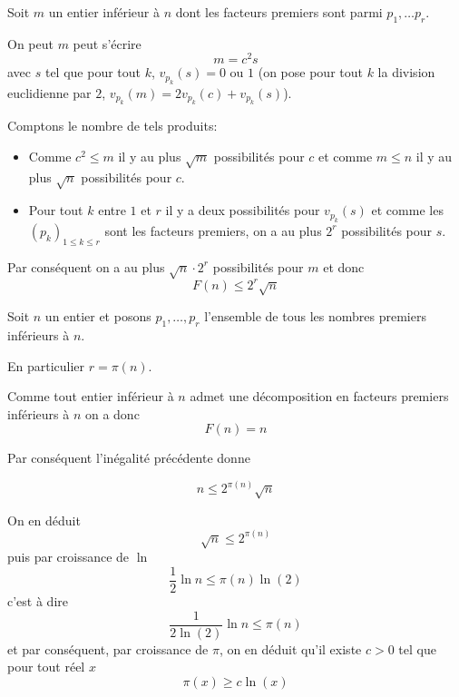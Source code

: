 \begin{sol}
Soit $m$ un entier inférieur à $n$ dont les facteurs premiers sont parmi $p_1, \ldots p_r$.

On peut $m$ peut s'écrire
$$ m = c^2 s$$
avec $s$ tel que pour tout $k$, $v_{p_k}(s) = 0 \text{ ou } 1$ (on pose pour tout $k$ la division euclidienne par $2$, $v_{p_k}(m) = 2 v_{p_k}(c) + v_{p_k}(s)$).

Comptons le nombre de tels produits:
\begin{itemize}
    \item Comme $c^2 \le m$ il y au plus $\sqrt m$ possibilités pour $c$ et comme $m \le n$ il y au plus $\sqrt n$ possibilités pour $c$.
    \item Pour tout $k$ entre $1$ et $r$ il y a deux possibilités pour $v_{p_k}(s)$ et comme les $(p_k)_{1 \le k \le r}$ sont les facteurs premiers, on a au plus $2^r$ possibilités pour $s$.
\end{itemize}

Par conséquent on a au plus $\sqrt n \cdot 2^r$ possibilités pour $m$ et donc
$$\boxed{F(n) \le 2^r \sqrt n}$$

Soit $n$ un entier et posons $p_1,\ldots,p_r$ l'ensemble de tous les nombres premiers inférieurs à $n$.

En particulier $r = \pi(n)$.

Comme tout entier inférieur à $n$ admet une décomposition en facteurs premiers inférieurs à $n$ on a donc
$$F(n) = n$$

Par conséquent l'inégalité précédente donne

$$n \le 2^{\pi(n)}\sqrt n$$

On en déduit 
$$\sqrt n \le 2^{\pi(n)}$$
puis par croissance de $\ln$ 
$$\frac{1}{2} \ln n \le \pi(n) \ln(2)$$
c'est à dire
$$\frac{1}{2 \ln(2)} \ln n \le \pi(n)$$
et par conséquent, par croissance de $\pi$, on en déduit qu'il existe $c>0$ tel que pour tout réel $x$
$$\boxed{\pi(x) \ge c \ln(x)}$$
\end{sol}



